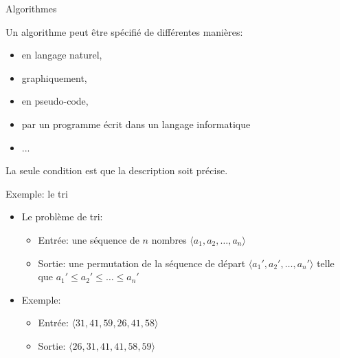\begin{frame}{Algorithmes}

Un algorithme peut être spécifié de différentes manières:
\begin{itemize}
\item en langage naturel,
\item graphiquement,
\item en pseudo-code,
\item par un programme écrit dans un langage informatique
\item ...
\end{itemize}
La seule condition est que la description soit précise.



\end{frame}


\begin{frame}{Exemple: le tri}
\begin{itemize}
\item Le problème de tri:
\begin{itemize}
\item Entrée: une séquence de $n$ nombres $\langle a_1,a_2,\ldots,a_n\rangle$
\item Sortie: une permutation de la séquence de départ $\langle a_1',a_2',\ldots,a_n'\rangle$ telle que $a_1'\leq a_2'\leq\ldots\leq a_n'$
\end{itemize}
\bigskip
\item Exemple:
\begin{itemize}
\item Entrée: $\langle 31,41,59,26,41,58\rangle$
\item Sortie: $\langle 26,31,41,41,58,59\rangle$
\end{itemize}
\end{itemize}

\end{frame}

